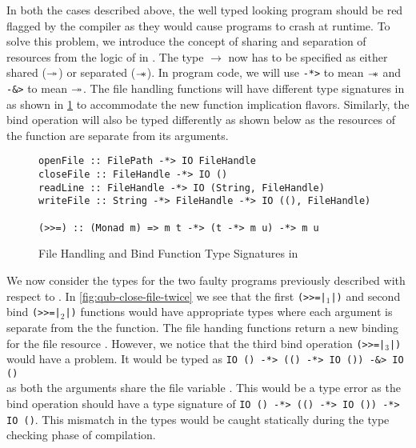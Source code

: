 In both the cases described above, the well typed looking program should be red flagged by the compiler as they would
cause programs to crash at runtime. To solve this problem, we introduce the %
concept of sharing and separation of resources from the logic of \BI{} in \qub{}. The type $\rightarrow$ now
has to be specified as either shared ($\twoheadrightarrow$) or separated ($\mathrel{-\mkern-6mu*}$). In \qub{} program code, we will use
\texttt{-*>} to mean $\mathrel{-\mkern-6mu*}$ and \texttt{-&>} to mean $\twoheadrightarrow$.
The file handling functions will have different type signatures in \qub{} as shown in \cref{fig:qub-file-handling-functions} to accommodate
the new function implication flavors. Similarly, the bind operation will also be typed differently as shown below as the resources of the function are
separate from its arguments.

\begin{figure}[h]
  \begin{framed}
    \begin{verbatim}
openFile :: FilePath -*> IO FileHandle
closeFile :: FileHandle -*> IO ()
readLine :: FileHandle -*> IO (String, FileHandle)
writeFile :: String -*> FileHandle -*> IO ((), FileHandle)

(>>=) :: (Monad m) => m t -*> (t -*> m u) -*> m u
    \end{verbatim}
  \end{framed}
  \caption{File Handling and Bind Function Type Signatures in \qub{}}
  \label{fig:qub-file-handling-functions}
\end{figure}

We now consider the types for the two faulty programs previously described with respect to \qub{}.
In \cref{fig:qub-close-file-twice} we see that the first \texttt{(>>=|$_1$|)}
and second bind \texttt{(>>=|$_2$|)} functions would have appropriate types
where each argument is separate from the the function. The file handing functions
return a new binding for the file resource . However, we notice that the third bind operation
\texttt{(>>=|$_3$|)} would have a problem. It  would be typed as
\texttt{IO () -*> (() -*> IO ()) -&> IO ()}\\
as both the arguments share the file variable . This would be a type error
as the bind operation should have a type signature of \texttt{IO () -*> (() -*> IO ()) -*> IO ()}.
This mismatch in the types would be caught statically during the type checking phase of compilation.


